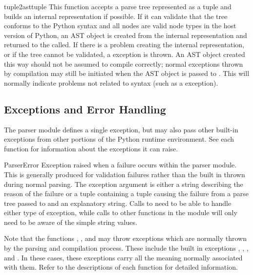 \begin{funcdesc}{tuple2ast}{tuple}
This function accepts a parse tree represented as a tuple and builds
an internal representation if possible.  If it can validate that the
tree conforms to the Python syntax and all nodes are valid node types
in the host version of Python, an AST object is created from the
internal representation and returned to the called.  If there is a
problem creating the internal representation, or if the tree cannot be
validated, a  exception is thrown.  An AST object
created this way should not be assumed to compile correctly; normal
exceptions thrown by compilation may still be initiated when the AST
object is passed to .  This will normally indicate
problems not related to syntax (such as a 
exception).
\end{funcdesc}


\subsection{Exceptions and Error Handling}

The parser module defines a single exception, but may also pass other
built-in exceptions from other portions of the Python runtime
environment.  See each function for information about the exceptions
it can raise.

\begin{excdesc}{ParserError}
Exception raised when a failure occurs within the parser module.  This
is generally produced for validation failures rather than the built in
 thrown during normal parsing.
The exception argument is either a string describing the reason of the
failure or a tuple containing a tuple causing the failure from a parse
tree passed to  and an explanatory string.  Calls to
 need to be able to handle either type of exception,
while calls to other functions in the module will only need to be
aware of the simple string values.
\end{excdesc}

Note that the functions , , and
 may throw exceptions which are normally thrown by the
parsing and compilation process.  These include the built in
exceptions , ,
, and .  In these cases, these
exceptions carry all the meaning normally associated with them.  Refer
to the descriptions of each function for detailed information.


